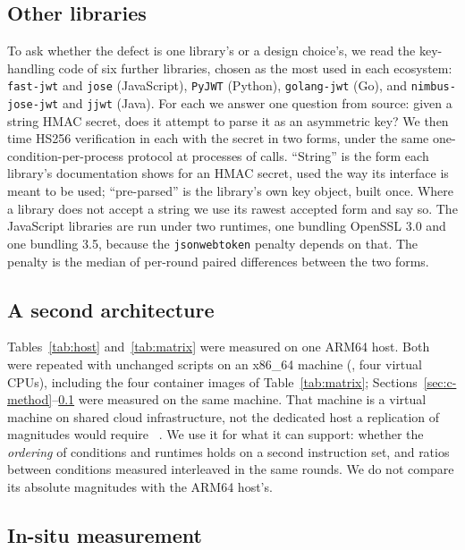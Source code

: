 \documentclass[pdflatex,sn-basic,twocolumn]{sn-jnl}%
\newcommand{\LibraryName}{\texttt{jsonwebtoken}}
\providecommand{\DIFaddbegin}{} %
\providecommand{\DIFaddend}{} %
\providecommand{\DIFdelbegin}{} %
\providecommand{\DIFdelend}{} %
\newcommand{\DIFscaledelfig}{0.5}
\newlength{\DIFdelgraphicswidth} %
\newlength{\DIFdelgraphicsheight} %
\newcommand{\DIFaddincludegraphics}[2][]{{\color{blue}\fbox{\DIFOincludegraphics[#1]{#2}}}} %
\newcommand{\DIFdelincludegraphics}[2][]{%
\sbox{\DIFdelgraphicsbox}{\DIFOincludegraphics[#1]{#2}}%
\settoboxwidth{\DIFdelgraphicswidth}{\DIFdelgraphicsbox} %
\settoboxtotalheight{\DIFdelgraphicsheight}{\DIFdelgraphicsbox} %
\scalebox{\DIFscaledelfig}{%
\parbox[b]{\DIFdelgraphicswidth}{\usebox{\DIFdelgraphicsbox}\\[-\baselineskip] \rule{\DIFdelgraphicswidth}{0em}}\llap{\resizebox{\DIFdelgraphicswidth}{\DIFdelgraphicsheight}{%
\setlength{\unitlength}{\DIFdelgraphicswidth}%
\begin{picture}(1,1)%
\thicklines\linethickness{2pt} %
{\color[rgb]{1,0,0}\put(0,0){\framebox(1,1){}}}%
{\color[rgb]{1,0,0}\put(0,0){\line( 1,1){1}}}%
{\color[rgb]{1,0,0}\put(0,1){\line(1,-1){1}}}%
\end{picture}%
}\hspace*{3pt}}} %
} %
\DeclareRobustCommand{\DIFaddbegin}{\DIFOaddbegin \let\includegraphics\DIFaddincludegraphics} %
\DeclareRobustCommand{\DIFaddend}{\DIFOaddend \let\includegraphics\DIFOincludegraphics} %
\DeclareRobustCommand{\DIFdelbegin}{\DIFOdelbegin \let\includegraphics\DIFdelincludegraphics} %
\DeclareRobustCommand{\DIFdelend}{\DIFOaddend \let\includegraphics\DIFOincludegraphics} %
\begin{document}
\subsection{Other libraries}\label{sec:xlib-method}

To ask whether the defect is one library's or a design choice's, we read the
key-handling code of six further libraries, chosen as the most used in each
ecosystem: \texttt{fast-jwt} and \texttt{jose} (JavaScript), \texttt{PyJWT}
(Python), \texttt{golang-jwt} (Go), and \texttt{nimbus-jose-jwt} and
\texttt{jjwt} (Java). For each we answer one question from source: given a
string HMAC secret, does it attempt to parse it as an asymmetric key? We then
time HS256 verification in each with the secret in two forms, under the same
one-condition-per-process protocol at \XlibInvocations{} processes of
\XlibCallsPerInvocation{} calls. ``String'' is the form each library's
documentation shows for an HMAC secret, used the way its interface is meant to
be used; ``pre-parsed'' is the library's own key object, built once. Where a
library does not accept a string we use its rawest accepted form and say so.
The JavaScript libraries are run under two runtimes, one bundling OpenSSL 3.0
and one bundling 3.5, because the \LibraryName{} penalty depends on that. The
penalty is the median of per-round paired differences between the two forms.

\subsection{A second architecture}\label{sec:arch-method}

Tables~\ref{tab:host} and~\ref{tab:matrix} were measured on one ARM64 host.
Both were repeated with unchanged scripts on an x86\_64 machine (\ExcCpuModel,
four virtual CPUs), including the four container images of
Table~\ref{tab:matrix}; Sections~\ref{sec:c-method}--\ref{sec:xlib-method}
were measured on the same machine. That machine is a virtual machine on shared
cloud infrastructure, not the dedicated host a replication of magnitudes would
require~\DIFdelbegin %
\DIFdelend \DIFaddbegin \citep{laaber2019cloud,leitner2016patterns}\DIFaddend . We use it for what it can
support: whether the \emph{ordering} of conditions and runtimes holds on a
second instruction set, and ratios between conditions measured interleaved in
the same rounds. We do not compare its absolute magnitudes with the ARM64
host's.

\subsection{In-situ measurement}\label{sec:insitu-method}
\end{document}
